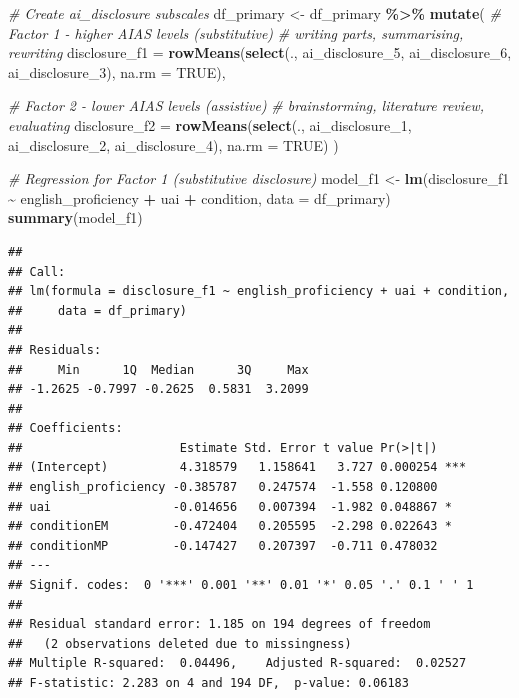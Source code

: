 \documentclass[
]{article}
\newenvironment{Shaded}{\begin{snugshade}}{\end{snugshade}}
\newcommand{\AttributeTok}[1]{\textcolor[rgb]{0.13,0.29,0.53}{#1}}
\newcommand{\CommentTok}[1]{\textcolor[rgb]{0.56,0.35,0.01}{\textit{#1}}}
\newcommand{\ConstantTok}[1]{\textcolor[rgb]{0.56,0.35,0.01}{#1}}
\newcommand{\FunctionTok}[1]{\textcolor[rgb]{0.13,0.29,0.53}{\textbf{#1}}}
\newcommand{\NormalTok}[1]{#1}
\newcommand{\OtherTok}[1]{\textcolor[rgb]{0.56,0.35,0.01}{#1}}
\newcommand{\SpecialCharTok}[1]{\textcolor[rgb]{0.81,0.36,0.00}{\textbf{#1}}}
\begin{document}
\begin{Shaded}
\begin{Highlighting}[]
\CommentTok{\# Create ai\_disclosure subscales}
\NormalTok{df\_primary }\OtherTok{\textless{}{-}}\NormalTok{ df\_primary }\SpecialCharTok{\%\textgreater{}\%}
  \FunctionTok{mutate}\NormalTok{(}
    \CommentTok{\# Factor 1 {-} higher AIAS levels (substitutive)}
    \CommentTok{\# writing parts, summarising, rewriting}
    \AttributeTok{disclosure\_f1 =} \FunctionTok{rowMeans}\NormalTok{(}\FunctionTok{select}\NormalTok{(., ai\_disclosure\_5, }
\NormalTok{                                       ai\_disclosure\_6, }
\NormalTok{                                       ai\_disclosure\_3), }\AttributeTok{na.rm =} \ConstantTok{TRUE}\NormalTok{),}
    
    \CommentTok{\# Factor 2 {-} lower AIAS levels (assistive)}
    \CommentTok{\# brainstorming, literature review, evaluating}
    \AttributeTok{disclosure\_f2 =} \FunctionTok{rowMeans}\NormalTok{(}\FunctionTok{select}\NormalTok{(., ai\_disclosure\_1, }
\NormalTok{                                       ai\_disclosure\_2, }
\NormalTok{                                       ai\_disclosure\_4), }\AttributeTok{na.rm =} \ConstantTok{TRUE}\NormalTok{)}
\NormalTok{  )}
\end{Highlighting}
\end{Shaded}

\begin{Shaded}
\begin{Highlighting}[]
\CommentTok{\# Regression for Factor 1 (substitutive disclosure)}
\NormalTok{model\_f1 }\OtherTok{\textless{}{-}} \FunctionTok{lm}\NormalTok{(disclosure\_f1 }\SpecialCharTok{\textasciitilde{}}\NormalTok{ english\_proficiency }\SpecialCharTok{+}\NormalTok{ uai }\SpecialCharTok{+}\NormalTok{ condition,}
               \AttributeTok{data =}\NormalTok{ df\_primary)}
\FunctionTok{summary}\NormalTok{(model\_f1)}
\end{Highlighting}
\end{Shaded}

\begin{verbatim}
## 
## Call:
## lm(formula = disclosure_f1 ~ english_proficiency + uai + condition, 
##     data = df_primary)
## 
## Residuals:
##     Min      1Q  Median      3Q     Max 
## -1.2625 -0.7997 -0.2625  0.5831  3.2099 
## 
## Coefficients:
##                      Estimate Std. Error t value Pr(>|t|)    
## (Intercept)          4.318579   1.158641   3.727 0.000254 ***
## english_proficiency -0.385787   0.247574  -1.558 0.120800    
## uai                 -0.014656   0.007394  -1.982 0.048867 *  
## conditionEM         -0.472404   0.205595  -2.298 0.022643 *  
## conditionMP         -0.147427   0.207397  -0.711 0.478032    
## ---
## Signif. codes:  0 '***' 0.001 '**' 0.01 '*' 0.05 '.' 0.1 ' ' 1
## 
## Residual standard error: 1.185 on 194 degrees of freedom
##   (2 observations deleted due to missingness)
## Multiple R-squared:  0.04496,    Adjusted R-squared:  0.02527 
## F-statistic: 2.283 on 4 and 194 DF,  p-value: 0.06183
\end{verbatim}
\end{document}
